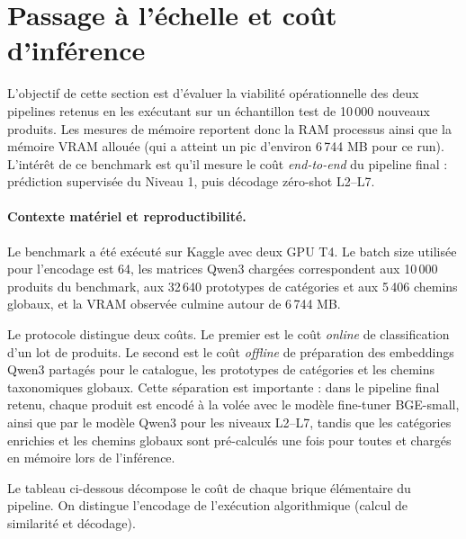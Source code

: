\documentclass[12pt,a4paper]{report}
\begin{document}
\section{Passage à l'échelle et coût d'inférence}
\label{sec:conclusion-scale-up}

L'objectif de cette section est d'évaluer la viabilité opérationnelle des deux pipelines retenus en les exécutant sur un échantillon test de 10\,000 nouveaux produits.
Les mesures de mémoire reportent donc la RAM processus ainsi que la mémoire VRAM
allouée (qui a atteint un pic d'environ 6\,744 MB pour ce run). L'intérêt de ce benchmark est qu'il mesure
le coût \emph{end-to-end} du pipeline final : prédiction supervisée du Niveau 1,
puis décodage zéro-shot L2--L7.

\paragraph{Contexte matériel et reproductibilité.}
Le benchmark a été exécuté sur Kaggle avec deux GPU T4. Le batch size utilisée pour l'encodage est 64, les matrices Qwen3 chargées correspondent aux 10\,000 produits du benchmark, aux 32\,640 prototypes de catégories et aux 5\,406 chemins globaux, et la VRAM observée culmine autour de 6\,744 MB.

Le protocole distingue deux coûts. Le premier est le coût \emph{online} de
classification d'un lot de produits. Le second est le coût \emph{offline} de
préparation des embeddings Qwen3 partagés pour le catalogue, les prototypes de
catégories et les chemins taxonomiques globaux. Cette séparation est importante :
dans le pipeline final retenu, chaque produit est encodé à la volée avec le
modèle fine-tuner BGE-small, ainsi que par le modèle Qwen3 pour les niveaux L2--L7, tandis que les catégories enrichies et les chemins globaux sont pré-calculés une fois pour toutes et chargés en mémoire lors de l'inférence.

Le tableau ci-dessous décompose le coût de chaque brique élémentaire du pipeline. On distingue l'encodage de l'exécution algorithmique (calcul de similarité et décodage).
\end{document}
